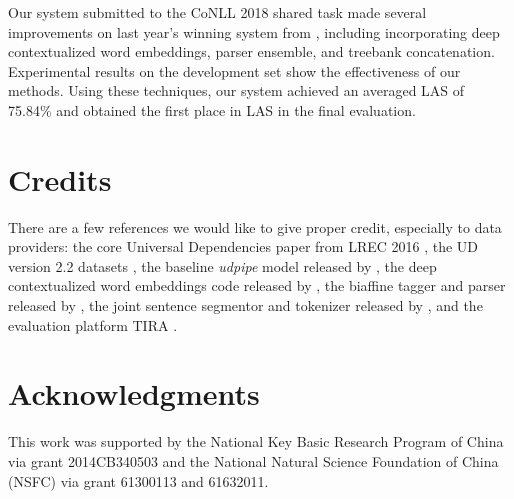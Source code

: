 \documentclass[11pt,a4paper]{article}
\begin{document}
Our system submitted to the CoNLL 2018 shared task made several improvements
on last year's winning system from \citet{dozat-qi-manning:2017:K17-3},
including incorporating deep contextualized word embeddings,
parser ensemble, and treebank concatenation.
Experimental results on the development set show the effectiveness of our methods.
Using  these techniques, our system achieved an averaged LAS of 75.84\%
and obtained the first place in LAS in the final evaluation.

\section{Credits}

There are a few references we would like to
give proper credit, especially to data providers:
the core Universal Dependencies paper from LREC 2016 \cite{ud},
the UD version 2.2 datasets \cite{ud22testdata}, 
the baseline \textit{udpipe} model released by \citet{udpipe},
the deep contextualized word embeddings code released by \citet{N18-1202},
the biaffine tagger and parser released by \citet{dozat-qi-manning:2017:K17-3},
the joint sentence segmentor and tokenizer released by \citet{delhoneux-EtAl:2017:K17-3},
and the evaluation platform TIRA \cite{tira}.

\section*{Acknowledgments}
This work was supported by the National Key Basic Research Program of China
via grant 2014CB340503 and the National Natural Science Foundation of China (NSFC)
via grant 61300113 and 61632011.
\end{document}
